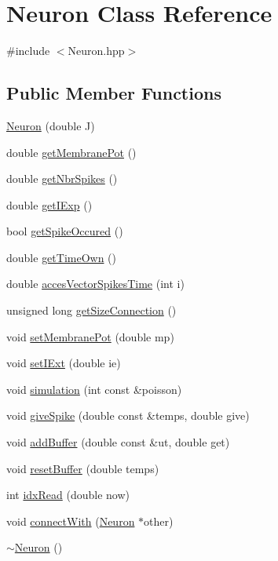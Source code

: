 \hypertarget{class_neuron}{}\section{Neuron Class Reference}
\label{class_neuron}


{\ttfamily \#include $<$Neuron.\+hpp$>$}

\subsection*{Public Member Functions}
\begin{DoxyCompactItemize}
\item 
\hyperlink{class_neuron_abefafe25b0ffd7144510bd26d193fe3b}{Neuron} (double J)
\item 
double \hyperlink{class_neuron_a16fc44c9bb8a982d7d79b6df830c02c2}{get\+Membrane\+Pot} ()
\item 
double \hyperlink{class_neuron_aa7c31be66993ad85efbb5b3a5dc4b9be}{get\+Nbr\+Spikes} ()
\item 
double \hyperlink{class_neuron_ad2768482bcfc532fac89f53b512b6ac8}{get\+I\+Exp} ()
\item 
bool \hyperlink{class_neuron_a362d9688fd4da9d6edbd28f8691fb0dc}{get\+Spike\+Occured} ()
\item 
double \hyperlink{class_neuron_a13c081d437037dc7b63108e524f66fc7}{get\+Time\+Own} ()
\item 
double \hyperlink{class_neuron_a178217a3d7ccc951c207a78883a26546}{acces\+Vector\+Spikes\+Time} (int i)
\item 
unsigned long \hyperlink{class_neuron_a807d071a7f1149f9db0536af4f45e684}{get\+Size\+Connection} ()
\item 
void \hyperlink{class_neuron_a7613a6978d583cbbe287876144325780}{set\+Membrane\+Pot} (double mp)
\item 
void \hyperlink{class_neuron_ad267b5027c8549d85ade592918286b89}{set\+I\+Ext} (double ie)
\item 
void \hyperlink{class_neuron_abce9bb9eecd7ff1f93b5a816bdaacc6f}{simulation} (int const \&poisson)
\item 
void \hyperlink{class_neuron_ae45fbadb556036a0f33b2f1790ccd5d7}{give\+Spike} (double const \&temps, double give)
\item 
void \hyperlink{class_neuron_aa31661c57b4a07fc1ec4984be980b678}{add\+Buffer} (double const \&ut, double get)
\item 
void \hyperlink{class_neuron_a62d6ff8e0fb0f776dfa9bc555a994b8b}{reset\+Buffer} (double temps)
\item 
int \hyperlink{class_neuron_a0276a70354f2fb046123efeec43420dc}{idx\+Read} (double now)
\item 
void \hyperlink{class_neuron_a41d30979b71ec096e1fd04f9e4de25d4}{connect\+With} (\hyperlink{class_neuron}{Neuron} $\ast$other)
\item 
\hyperlink{class_neuron_a94a250ce7e167760e593979b899745b1}{$\sim$\+Neuron} ()
\end{DoxyCompactItemize}


